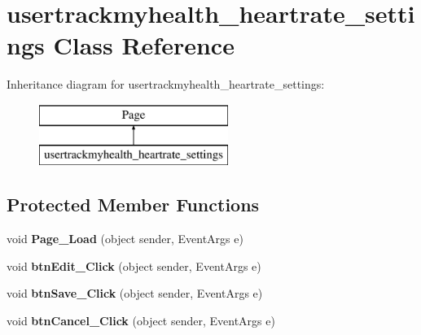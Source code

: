 \hypertarget{classusertrackmyhealth__heartrate__settings}{\section{usertrackmyhealth\-\_\-heartrate\-\_\-settings Class Reference}
\label{classusertrackmyhealth__heartrate__settings}
}
Inheritance diagram for usertrackmyhealth\-\_\-heartrate\-\_\-settings\-:\begin{figure}[H]
\begin{center}
\leavevmode
\includegraphics[height=2.000000cm]{classusertrackmyhealth__heartrate__settings}
\end{center}
\end{figure}
\subsection*{Protected Member Functions}
\begin{DoxyCompactItemize}
\item 
\hypertarget{classusertrackmyhealth__heartrate__settings_ad4cba7a7d39f2129f465369f8aa04255}{void {\bfseries Page\-\_\-\-Load} (object sender, Event\-Args e)}\label{classusertrackmyhealth__heartrate__settings_ad4cba7a7d39f2129f465369f8aa04255}

\item 
\hypertarget{classusertrackmyhealth__heartrate__settings_a8f0e15cbc4117ac91e9d8b8e68532dee}{void {\bfseries btn\-Edit\-\_\-\-Click} (object sender, Event\-Args e)}\label{classusertrackmyhealth__heartrate__settings_a8f0e15cbc4117ac91e9d8b8e68532dee}

\item 
\hypertarget{classusertrackmyhealth__heartrate__settings_a59fce8215e7872b61471f8c955aff284}{void {\bfseries btn\-Save\-\_\-\-Click} (object sender, Event\-Args e)}\label{classusertrackmyhealth__heartrate__settings_a59fce8215e7872b61471f8c955aff284}

\item 
\hypertarget{classusertrackmyhealth__heartrate__settings_ab391e3f15819139673dac6c91da5c6e3}{void {\bfseries btn\-Cancel\-\_\-\-Click} (object sender, Event\-Args e)}\label{classusertrackmyhealth__heartrate__settings_ab391e3f15819139673dac6c91da5c6e3}

\end{DoxyCompactItemize}


